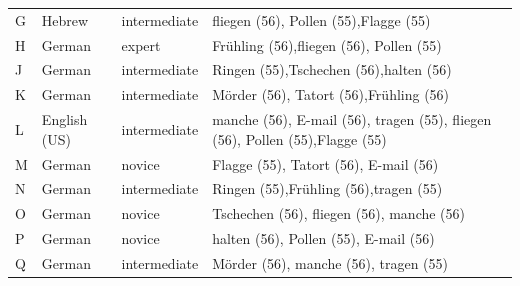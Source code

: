 \begin{table}[htb]
\begin{tabularx}{\textwidth}{lllX}
		G & Hebrew	& intermediate & 	fliegen (56), \newline Pollen (55),\newline Flagge (55)	 \TODO{FALSE}   \\
		
		H & German & expert &		Fr\"{u}hling (56),\newline fliegen (56), \newline Pollen (55) \\
		
		J & 	German & intermediate &		Ringen (55),\newline Tschechen (56),\newline halten (56)	 \\
		
		K &	German	 & intermediate & M\"{o}rder (56),   \newline Tatort (56),\newline Fr\"{u}hling (56) \\
		
		L & English (US)	& intermediate &  manche (56),  \newline E-mail (56),  \newline tragen (55),	 \newline   fliegen (56), \newline Pollen (55),\newline Flagge (55) \\
		
		M & German	 & novice & Flagge (55), \newline Tatort (56), \newline E-mail (56) 	 \\
		
		N & 	German	 & intermediate & Ringen (55),\newline Fr\"{u}hling (56),\newline tragen (55)	 \\
		
		O & German	& novice & Tschechen (56), \newline fliegen (56), \newline manche (56)	 \\
		
		P & German & novice & 	halten (56), \newline Pollen (55), \newline E-mail (56)	 \\
		
		Q	& German	 & intermediate & Mörder (56),  \newline manche (56), \newline tragen (55) \\
		
		\bottomrule
		\end{tabularx}
		\label{tab:annotators}
	\end{table}


